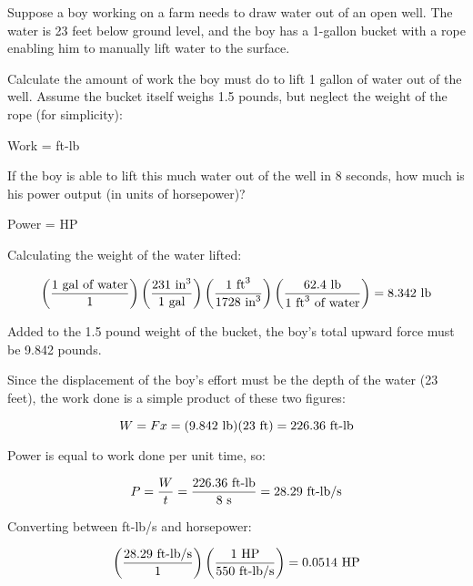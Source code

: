 

Suppose a boy working on a farm needs to draw water out of an open well.  The water is 23 feet below ground level, and the boy has a 1-gallon bucket with a rope enabling him to manually lift water to the surface.

\vskip 10pt

Calculate the amount of work the boy must do to lift 1 gallon of water out of the well.  Assume the bucket itself weighs 1.5 pounds, but neglect the weight of the rope (for simplicity):

\vskip 10pt

Work = \underbar{\hskip 50pt} ft-lb

\vskip 30pt

If the boy is able to lift this much water out of the well in 8 seconds, how much is his power output (in units of horsepower)?

\vskip 10pt

Power = \underbar{\hskip 50pt} HP

\vskip 10pt







Calculating the weight of the water lifted:

$$\left(1 \hbox{ gal of water} \over 1 \right) \left(231 \hbox{ in}^3 \over 1 \hbox{ gal}\right) \left(1 \hbox{ ft}^3 \over 1728 \hbox{ in}^3\right) \left(62.4 \hbox{ lb} \over 1 \hbox{ ft}^3 \hbox{ of water}\right) = 8.342 \hbox{ lb}$$

Added to the 1.5 pound weight of the bucket, the boy's total upward force must be 9.842 pounds.
 
\vskip 10pt

Since the displacement of the boy's effort must be the depth of the water (23 feet), the work done is a simple product of these two figures:

$$W = F x = (9.842 \hbox{ lb}) (23 \hbox{ ft}) = 226.36 \hbox{ ft-lb}$$

\vskip 10pt

Power is equal to work done per unit time, so:

$$P = {W \over t} = {226.36 \hbox{ ft-lb} \over 8 \hbox{ s}} = 28.29 \hbox{ ft-lb/s}$$

Converting between ft-lb/s and horsepower:

$$\left(28.29 \hbox{ ft-lb/s} \over 1 \right) \left(1 \hbox{ HP} \over 550 \hbox{ ft-lb/s}\right) = 0.0514 \hbox{ HP}$$











